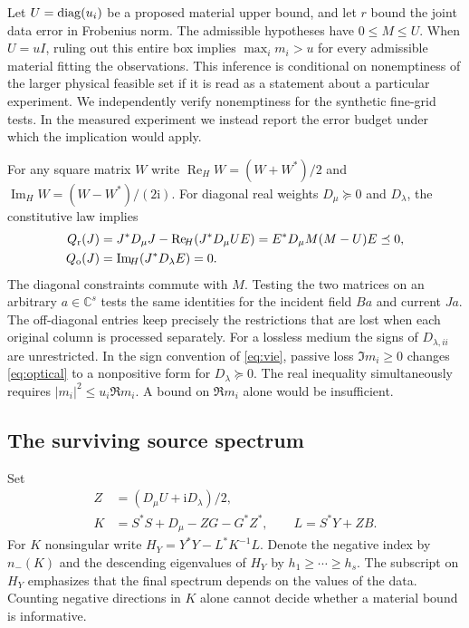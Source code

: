 \documentclass[anonymous,12pt]{iopjournal}
\theoremstyle{remark}\newtheorem{remark}[theorem]{Remark}
\newcommand{\C}{\mathbb C}\newcommand{\R}{\mathbb R}
\newcommand{\Herm}{\operatorname{Re}_{\!H}}\newcommand{\Imag}{\operatorname{Im}_{\!H}}
\newcommand{\Dpos}{D_{\mu}}\newcommand{\Dopt}{D_{\lambda}}
\numberwithin{equation}{section}
\begin{document}
Let $U=\operatorname{diag}(u_i)$ be a proposed material upper bound, and let $r$ bound the joint data error in Frobenius norm. The admissible hypotheses have $0\le M\le U$. When $U=uI$, ruling out this entire box implies $\max_i m_i>u$ for every admissible material fitting the observations. This inference is conditional on nonemptiness of the larger physical feasible set if it is read as a statement about a particular experiment. We independently verify nonemptiness for the synthetic fine-grid tests. In the measured experiment we instead report the error budget under which the implication would apply.

For any square matrix $W$ write $\Herm W=(W+W^*)/2$ and $\Imag W=(W-W^*)/(2\mathrm i)$. For diagonal real weights $\Dpos\succeq0$ and $\Dopt$, the constitutive law implies
\begin{align}
 Q_{\rm r}(J)&=J^*\Dpos J-\Herm(J^*\Dpos U E)
       =E^*\Dpos M(M-U)E\preceq0,\label{eq:sector}\\
 Q_{\rm o}(J)&=\Imag(J^*\Dopt E)=0.\label{eq:optical}
\end{align}
The diagonal constraints commute with $M$. Testing the two matrices on an arbitrary $a\in\C^s$ tests the same identities for the incident field $Ba$ and current $Ja$. The off-diagonal entries keep precisely the restrictions that are lost when each original column is processed separately. For a lossless medium the signs of $D_{\lambda,ii}$ are unrestricted. In the sign convention of \eqref{eq:vie}, passive loss $\Im m_i\ge0$ changes \eqref{eq:optical} to a nonpositive form for $\Dopt\succeq0$. The real inequality simultaneously requires $|m_i|^2\le u_i\Re m_i$. A bound on $\Re m_i$ alone would be insufficient.

\subsection{The surviving source spectrum}
Set
\begin{align}
 Z&=(\Dpos U+\mathrm i\Dopt)/2,\nonumber\\
 K&=S^*S+\Dpos-ZG-G^*Z^*,\qquad L=S^*Y+ZB. \label{eq:operators}
\end{align}
For $K$ nonsingular write $H_Y=Y^*Y-L^*K^{-1}L$. Denote the negative index by $n_-(K)$ and the descending eigenvalues of $H_Y$ by $h_1\ge\cdots\ge h_s$. The subscript on $H_Y$ emphasizes that the final spectrum depends on the values of the data. Counting negative directions in $K$ alone cannot decide whether a material bound is informative.
\end{document}
